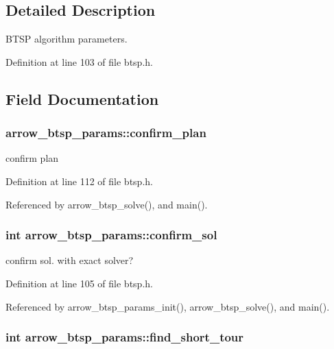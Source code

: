 \subsection{Detailed Description}
BTSP algorithm parameters. 

Definition at line 103 of file btsp.h.

\subsection{Field Documentation}
\hypertarget{structarrow__btsp__params_f6a3bf7e56264d14b9dceb4ce779363c}{
\subsubsection[{confirm\_\-plan}]{ {\bf arrow\_\-btsp\_\-params::confirm\_\-plan}}}
\label{structarrow__btsp__params_f6a3bf7e56264d14b9dceb4ce779363c}


confirm plan 

Definition at line 112 of file btsp.h.

Referenced by arrow\_\-btsp\_\-solve(), and main().\hypertarget{structarrow__btsp__params_2c579feb3ff41f4d73b5de97596fe465}{
\subsubsection[{confirm\_\-sol}]{\setlength{\rightskip}{0pt plus 5cm}int {\bf arrow\_\-btsp\_\-params::confirm\_\-sol}}}
\label{structarrow__btsp__params_2c579feb3ff41f4d73b5de97596fe465}


confirm sol. with exact solver? 

Definition at line 105 of file btsp.h.

Referenced by arrow\_\-btsp\_\-params\_\-init(), arrow\_\-btsp\_\-solve(), and main().\hypertarget{structarrow__btsp__params_f5fd677200b64930838c6905cbada990}{
\subsubsection[{find\_\-short\_\-tour}]{\setlength{\rightskip}{0pt plus 5cm}int {\bf arrow\_\-btsp\_\-params::find\_\-short\_\-tour}}}
\label{structarrow__btsp__params_f5fd677200b64930838c6905cbada990}


